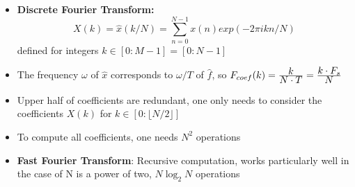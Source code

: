 \begin{itemize}
\begin{enumerate}
        \end{enumerate}
    \item
        \textbf{Discrete Fourier Transform:}
        $$ X(k) = \hat{x}(k/N) = \sum_{n=0}^{N-1} x(n) exp(-2\pi i k n/N)$$
        defined for integers $k \in [0: M-1] = [0 : N-1]$
    \item
        The frequency $\omega$ of $\hat{x}$ corresponds to $\omega/T$ of $\hat{f}$, so $F_{coef}(k) = \frac{\displaystyle k}{\displaystyle N \cdot T} = \frac{\displaystyle k \cdot F_s}{\displaystyle N}$
    \item
        Upper half of coefficients are redundant, one only needs to consider the coefficients $X(k)$ for $k \in [0: \lfloor N/2 \rfloor]$
    \item
        To compute all coefficients, one needs $N^2$ operations
    \item
        \textbf{Fast Fourier Transform}: Recursive computation, works particularly well in the case of N is a power of two, $N\log_2N$ operations
\end{itemize}

